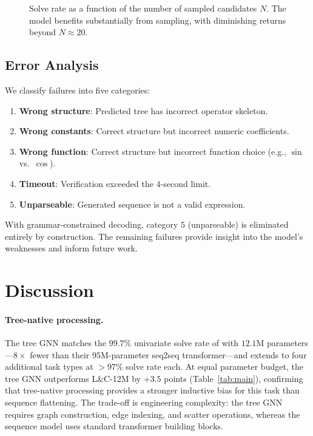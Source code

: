 \documentclass{article}
\begin{document}
\begin{figure}[t]
	\centering
	\caption{Solve rate as a function of the number of sampled candidates
		$N$. The model benefits substantially from sampling, with diminishing
		returns beyond $N\!\approx\!20$.}
	\label{fig:n_samples}
\end{figure}


\subsection{Error Analysis}

We classify failures into five categories:
\begin{enumerate}
	\item \textbf{Wrong structure}: Predicted tree has incorrect operator
	      skeleton.
	\item \textbf{Wrong constants}: Correct structure but incorrect numeric
	      coefficients.
	\item \textbf{Wrong function}: Correct structure but incorrect function
	      choice (e.g., $\sin$ vs.\ $\cos$).
	\item \textbf{Timeout}: Verification exceeded the $4$-second limit.
	\item \textbf{Unparseable}: Generated sequence is not a valid
	      expression.
\end{enumerate}
With grammar-constrained decoding, category $5$ (unparseable) is
eliminated entirely by construction. The remaining failures provide
insight into the model's weaknesses and inform future work.


\section{Discussion}
\label{sec:discussion}

\paragraph{Tree-native processing.}
The tree GNN matches the $99.7\%$ univariate solve rate of
\citet{lample2020deep} with $12.1$M parameters---$8\times$ fewer than
their $95$M-parameter seq2seq transformer---and extends to four
additional task types at $>97\%$ solve rate each. At equal parameter
budget, the tree GNN outperforms L\&C-12M by $+3.5$ points
(Table~\ref{tab:main}), confirming that tree-native processing
provides a stronger inductive bias for this task than sequence
flattening. The trade-off is engineering complexity: the tree GNN
requires graph construction, edge indexing, and scatter operations,
whereas the sequence model uses standard transformer building blocks.
\end{document}
